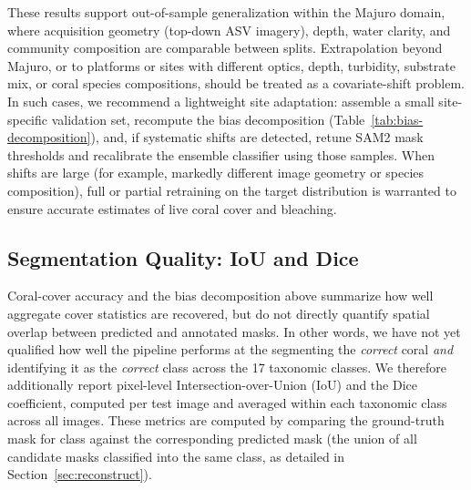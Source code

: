 \documentclass[11pt]{elsarticle}
\begin{document}
% 

These results support out-of-sample generalization within the Majuro domain, where acquisition geometry (top-down ASV imagery), depth, water clarity, and community composition are comparable between splits. Extrapolation beyond Majuro, or to platforms or sites with different optics, depth, turbidity, substrate mix, or coral species compositions, should be treated as a covariate-shift problem. In such cases, we recommend a lightweight site adaptation: assemble a small site-specific validation set, recompute the bias decomposition (Table~\ref{tab:bias-decomposition}), and, if systematic shifts are detected, retune SAM2 mask thresholds and recalibrate the ensemble classifier using those samples. When shifts are large (for example, markedly different image geometry or species composition), full or partial retraining on the target distribution is warranted to ensure accurate estimates of live coral cover and bleaching.

\subsection{Segmentation Quality: IoU and Dice}
\label{sec:iou_dice}

Coral-cover accuracy and the bias decomposition above summarize how well aggregate cover statistics are recovered, but do not directly quantify spatial overlap between predicted and annotated masks. In other words, we have not yet qualified how well the pipeline performs at the segmenting the \emph{correct} coral \emph{and} identifying it as the \emph{correct} class across the 17 taxonomic classes. We therefore additionally report pixel-level Intersection-over-Union (IoU) and the Dice coefficient, computed per test image and averaged within each taxonomic class across all images. These metrics are computed by comparing the ground-truth mask for class against the corresponding predicted mask (the union of all candidate masks classified into the same class, as detailed in Section~\ref{sec:reconstruct}).
\end{document}
